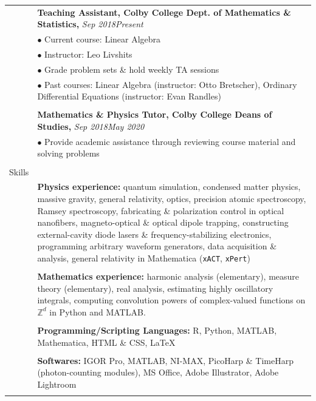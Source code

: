 \documentclass[10pt]{article}
\begin{document}
\begin{longtable}{ l p{14.7cm}   }
     					& \textbf{Teaching Assistant, Colby College Dept. of Mathematics \& Statistics,}  \textit{Sep 2018\textendash Present} \\
     					& $\bullet$ Current course: Linear Algebra\\
     					& $\bullet$ Instructor: Leo Livshits \\
     					& $\bullet$ Grade problem sets \& hold weekly TA sessions \\ %
     					& $\bullet$ Past courses: Linear Algebra (instructor: Otto Bretscher), Ordinary Differential Equations (instructor: Evan Randles)\\
     					& \\
     					 
     					& \textbf{Mathematics \& Physics Tutor, Colby College Deans of Studies,}  \textit{Sep 2018\textendash May 2020} \\
     					&  $\bullet$ Provide academic assistance through reviewing course material and solving problems \\
     					& \\
     					 
     					 
     					 
  
     				 	 
  
  
  						 
  						 
  \large{Skills}      	& \\ 
  						& \textbf{Physics experience:} quantum simulation, condensed matter physics, massive gravity,  general relativity, optics, precision atomic spectroscopy, Ramsey spectroscopy, fabricating \& polarization control in optical nanofibers, magneto-optical \& optical dipole trapping, constructing external-cavity diode lasers \& frequency-stabilizing electronics, programming arbitrary waveform generators, data acquisition \& analysis, general relativity in Mathematica (\texttt{xACT}, \texttt{xPert})  \\ 
  						& \\
  						& \textbf{Mathematics experience:} harmonic analysis (elementary), measure theory (elementary), real analysis, estimating highly oscillatory integrals, computing convolution powers of complex-valued functions on $\mathbb{Z}^d$ in Python and MATLAB.\\
  						& \\
  						& \textbf{Programming/Scripting Languages:} R, Python, MATLAB, Mathematica, HTML \& CSS, \LaTeX{}\\
  						& \\
  						& \textbf{Softwares:} IGOR Pro, MATLAB, NI-MAX, PicoHarp \& TimeHarp (photon-counting modules), MS Office,  Adobe Illustrator, Adobe Lightroom\\ 
  						& \\
  						 

\end{longtable}
\end{document}

